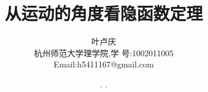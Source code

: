\documentclass[a4paper, 12pt]{article} %
\makeatletter
\renewcommand{\maketitle}{ %
  \renewcommand\refname{参考文献}
  \newcommand{\D}{\displaystyle}\newcommand{\ri}{\Rightarrow}
  \newcommand{\ds}{\displaystyle} \renewcommand{\ni}{\noindent}
  \newcommand{\pa}{\partial} \newcommand{\Om}{\Omega}
  \newcommand{\om}{\omega} \newcommand{\sik}{\sum_{i=1}^k}
  \newcommand{\vov}{\Vert\omega\Vert} \newcommand{\Umy}{U_{\mu_i,y^i}}
  \newcommand{\lamns}{\lambda_n^{^{\scriptstyle\sigma}}}
  \newcommand{\chiomn}{\chi_{_{\Omega_n}}}
  \newcommand{\ullim}{\underline{\lim}} \newcommand{\bsy}{\boldsymbol}
  \newcommand{\mvb}{\mathversion{bold}} \newcommand{\la}{\lambda}
  \newcommand{\La}{\Lambda} \newcommand{\va}{\varepsilon}
  \newcommand{\be}{\beta} \newcommand{\al}{\alpha}
  \newcommand{\dis}{\displaystyle} \newcommand{\R}{{\mathbb R}}
  \newcommand{\N}{{\mathbb N}} \newcommand{\cF}{{\mathcal F}}
  \newcommand{\gB}{{\mathfrak B}} \newcommand{\eps}{\epsilon}
  \begin{flushright} %
    {\LARGE\@title} %
    
    \vspace{50pt} %
    
    {\large\@author} %
    \\\@date %
    
    \vspace{40pt} %
  \end{flushright}
}
\makeatother
\begin{document}
\title{\textbf{从运动的角度看隐函数定理}}
\author{\small{叶卢庆}\\{\small{杭州师范大学理学院,学
      号:1002011005}}\\{\small{Email:h5411167@gmail.com}}} %
\renewcommand{\today}{\number\year. \number\month. \number\day}
\date{\today} %
  
  
  
\maketitle %
  
  
  
  
  
  
  
\end{document}

